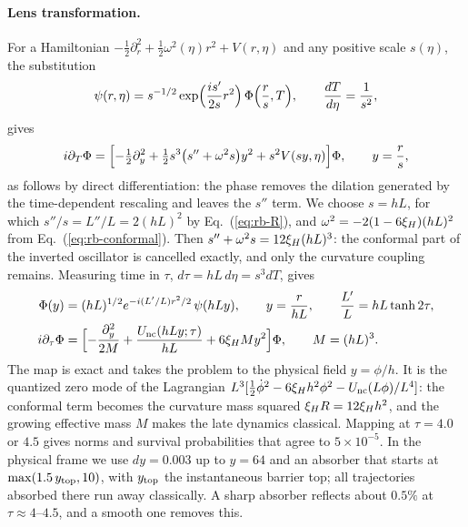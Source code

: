 \paragraph{Lens transformation.}
For a Hamiltonian $-\frac12\partial_r^2+\frac12\omega^2(\eta)r^2+V(r,\eta)$ and any positive scale $s(\eta)$, the substitution
\begin{equation}
\psi(r,\eta)=s^{-1/2}\exp\Bigl(\frac{is'}{2s}r^2\Bigr)\,\Phi\Bigl(\frac rs,T\Bigr),\qquad \frac{dT}{d\eta}=\frac1{s^2},
\label{eq:rb-lens-general}
\end{equation}
gives
\begin{equation}
i\partial_T\Phi=\Bigl[-\tfrac12\partial_y^2+\tfrac12s^3\bigl(s''+\omega^2s\bigr)y^2+s^2V(sy,\eta)\Bigr]\Phi,\qquad y=\frac rs,
\label{eq:rb-lens-ermakov}
\end{equation}
as follows by direct differentiation: the phase removes the dilation generated by the time-dependent rescaling and leaves the $s''$ term.
We choose $s=hL$, for which $s''/s=L''/L=2(hL)^2$ by Eq.~(\ref{eq:rb-R}), and $\omega^2=-2(1-6\xi_H)(hL)^2$ from Eq.~(\ref{eq:rb-conformal}).
Then $s''+\omega^2s=12\xi_H(hL)^3$: the conformal part of the inverted oscillator is cancelled exactly, and only the curvature coupling remains.
Measuring time in $\tau$, $d\tau=hL\,d\eta=s^3dT$, gives
\begin{align}
\Phi(y)&=(hL)^{1/2}e^{-i(L'/L)r^2/2}\,\psi(hLy),\qquad y=\frac{r}{hL},\qquad \frac{L'}{L}=hL\tanh2\tau,\nonumber\\
i\partial_\tau\Phi&=\Bigl[-\frac{\partial_y^2}{2M}+\frac{U_{\rm nc}(hLy;\tau)}{hL}+6\xi_H My^2\Bigr]\Phi,\qquad M=(hL)^3 .
\label{eq:rb-lens}
\end{align}
The map is exact and takes the problem to the physical field $y=\phi/h$.
It is the quantized zero mode of the Lagrangian $L^3[\frac12\dot\phi^2-6\xi_H h^2\phi^2-U_{\rm nc}(L\phi)/L^4]$: the conformal term becomes the curvature mass squared $\xi_H R=12\xi_H h^2$, and the growing effective mass $M$ makes the late dynamics classical.
Mapping at $\tau=4.0$ or $4.5$ gives norms and survival probabilities that agree to $5\times10^{-5}$. %
In the physical frame we use $dy=0.003$ up to $y=64$ and an absorber that starts at $\max(1.5\,y_{\rm top},10)$, with $y_{\rm top}$ the instantaneous barrier top; all trajectories absorbed there run away classically. %
A sharp absorber reflects about $0.5\%$ at $\tau\approx4$--$4.5$, and a smooth one removes this. %

